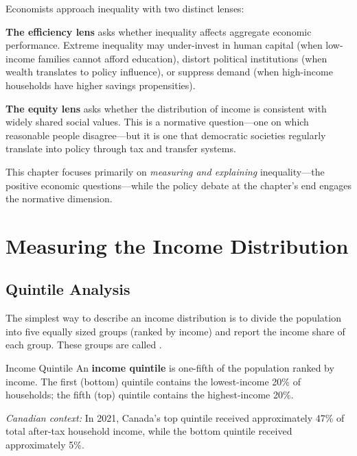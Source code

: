 Economists approach inequality with two distinct lenses:

\textbf{The efficiency lens} asks whether inequality affects aggregate economic performance. Extreme inequality may under-invest in human capital (when low-income families cannot afford education), distort political institutions (when wealth translates to policy influence), or suppress demand (when high-income households have higher savings propensities).

\textbf{The equity lens} asks whether the distribution of income is consistent with widely shared social values. This is a normative question---one on which reasonable people disagree---but it is one that democratic societies regularly translate into policy through tax and transfer systems.

This chapter focuses primarily on \textit{measuring and explaining} inequality---the positive economic questions---while the policy debate at the chapter's end engages the normative dimension.

\section{Measuring the Income Distribution}

\subsection{Quintile Analysis}

The simplest way to describe an income distribution is to divide the population into five equally sized groups (ranked by income) and report the income share of each group. These groups are called .

\begin{defbox}{Income Quintile}
An \textbf{income quintile} is one-fifth of the population ranked by income. The first (bottom) quintile contains the lowest-income 20\% of households; the fifth (top) quintile contains the highest-income 20\%.

\textit{Canadian context:} In 2021, Canada's top quintile received approximately 47\% of total after-tax household income, while the bottom quintile received approximately 5\%.
\end{defbox}


